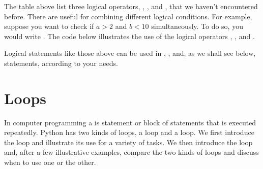\documentclass[letterpaper,10pt,english]{sphinxmanual}
\begin{document}
\sphinxAtStartPar
The table above list three logical operators, , , and , that we haven’t encountered before.  There are useful for combining different logical conditions.  For example, suppose you want to check if \(a>2\) and \(b<10\) simultaneously.  To do so, you would write .  The code below illustrates the use of the logical operators , , and .

\begin{sphinxVerbatim}[commandchars=\\\{\},numbers=left,firstnumber=1,stepnumber=1]
  

  

            

  

  

  


 
\end{sphinxVerbatim}

\sphinxAtStartPar
Logical statements like those above can be used in , , and, as we shall see below,  statements, according to your needs.

\ignorespaces 

\section{Loops}
\label{\detokenize{chap6/chap6_loopsconds:loops}}\label{\detokenize{chap6/chap6_loopsconds:index-2}}
\sphinxAtStartPar
In computer programming a  is statement or block of statements that is executed repeatedly.  Python has two kinds of loops, a  loop and a  loop.  We first introduce the  loop and illustrate its use for a variety of tasks.  We then introduce the  loop and, after a few illustrative examples, compare the two kinds of loops and discuss when to use one or the other.
\end{document}
